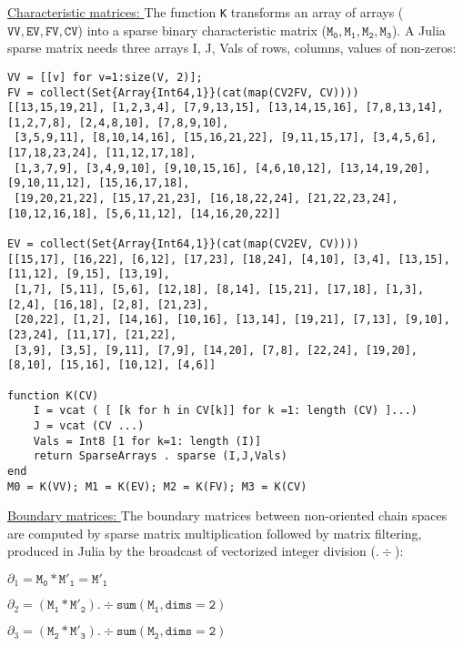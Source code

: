 \vspace{10pt}
\noindent\underline{
Characteristic matrices:
}\vspace{0.2em}\newline 
The function \texttt{K} transforms an array of arrays ($\mathtt{VV, EV, FV, CV}$) into a sparse binary characteristic matrix
($\mathtt{M_0, M_1, M_2, M_3}$). A Julia sparse matrix needs three arrays I, J, Vals of rows, columns, values of non-zeros:

\begin{Verbatim}[fontsize=\footnotesize]
VV = [[v] for v=1:size(V, 2)];
FV = collect(Set{Array{Int64,1}}(cat(map(CV2FV, CV))))
[[13,15,19,21], [1,2,3,4], [7,9,13,15], [13,14,15,16], [7,8,13,14], [1,2,7,8], [2,4,8,10], [7,8,9,10], 
 [3,5,9,11], [8,10,14,16], [15,16,21,22], [9,11,15,17], [3,4,5,6], [17,18,23,24], [11,12,17,18], 
 [1,3,7,9], [3,4,9,10], [9,10,15,16], [4,6,10,12], [13,14,19,20], [9,10,11,12], [15,16,17,18], 
 [19,20,21,22], [15,17,21,23], [16,18,22,24], [21,22,23,24], [10,12,16,18], [5,6,11,12], [14,16,20,22]]

EV = collect(Set{Array{Int64,1}}(cat(map(CV2EV, CV))))
[[15,17], [16,22], [6,12], [17,23], [18,24], [4,10], [3,4], [13,15], [11,12], [9,15], [13,19],
 [1,7], [5,11], [5,6], [12,18], [8,14], [15,21], [17,18], [1,3], [2,4], [16,18], [2,8], [21,23],
 [20,22], [1,2], [14,16], [10,16], [13,14], [19,21], [7,13], [9,10], [23,24], [11,17], [21,22],
 [3,9], [3,5], [9,11], [7,9], [14,20], [7,8], [22,24], [19,20], [8,10], [15,16], [10,12], [4,6]]

function K(CV)
    I = vcat ( [ [k for h in CV[k]] for k =1: length (CV) ]...)
    J = vcat (CV ...)
    Vals = Int8 [1 for k=1: length (I)]
    return SparseArrays . sparse (I,J,Vals)
end
M0 = K(VV); M1 = K(EV); M2 = K(FV); M3 = K(CV)
\end{Verbatim}

\vspace{10pt}
\noindent\underline{
Boundary matrices:
}\vspace{0.2em}\newline 
The boundary matrices between non-oriented chain spaces are computed by sparse matrix multiplication
followed by matrix filtering, produced in Julia by the broadcast of vectorized integer division ($.\div$):

$\partial_1 =  \mathtt{M_0} * \mathtt{M'_1} = \mathtt{M'_1}$

$\partial_2 =  \left(\mathtt{M_1} * \mathtt{M'_2}\right) .\div \mathtt{sum(M_1, dims=2)}$

$\partial_3 =  \left(\mathtt{M_2} * \mathtt{M'_3}\right) .\div \mathtt{sum(M_2, dims=2)}$